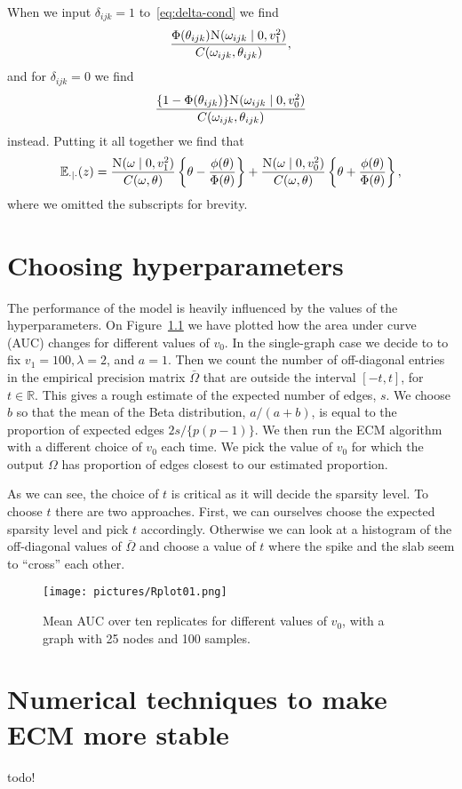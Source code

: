 \documentclass[a4paper, 11pt, oneside]{report}
\newcommand{\R}{\mathbb{R}}
\newcommand{\E}{\mathbb{E}}
\newcommand{\1}{\mathds{1}}
\newcommand{\Nor}{\textsc{N}}
\begin{document}
When we input $\delta_{ijk} = 1$ to~\eqref{eq:delta-cond} we find
\[
	\frac{\Phi(\theta_{ijk}) \Nor(\omega_{ijk} \mid 0, v_1^2)}{C(\omega_{ijk}, \theta_{ijk})},
\]
and for $\delta_{ijk} = 0$ we find
\[
	\frac{\{1 - \Phi(\theta_{ijk})\} \Nor(\omega_{ijk} \mid 0, v_0^2)}
	{C(\omega_{ijk}, \theta_{ijk})}
\]
instead.
Putting it all together we find that
\[
	\E_{\cdot \mid \cdot}(z) = \frac{\Nor(\omega \mid 0, v_1^2)}{C(\omega,
		\theta)} \left\{\theta - \frac{\phi(\theta)}{\Phi(\theta)}\right\} +
	\frac{\Nor(\omega \mid 0, v_0^2)}{C(\omega, \theta)} \left\{\theta +
	\frac{\phi(\theta)}{\Phi(\theta)}\right\},
\]
where we omitted the subscripts for brevity.

\chapter{Choosing hyperparameters}
The performance of the model is heavily influenced by the values of the
hyperparameters. On Figure~\ref{fig:mean_auc} we have plotted how the area
under curve (AUC) changes for different values of $v_0$. In the single-graph
case we decide to to fix $v_1 = 100,
	\lambda = 2$, and $a = 1$. Then we count the number of off-diagonal entries in
the empirical precision matrix $\bar \Omega$ that are outside the interval
$[-t, t]$, for $t \in \R$. This gives a rough estimate of the expected number
of edges, $s$. We choose $b$ so that the mean of the Beta distribution,
$a/(a+b)$, is equal to the proportion of expected edges $2s/\{p(p-1)\}$. We then
run the ECM algorithm with a different choice of $v_0$ each time. We pick the
value of $v_0$ for which the output $\Omega$ has proportion of edges closest to
our estimated proportion.

As we can see, the choice of $t$ is critical as it will decide the sparsity level.
To choose $t$ there are two approaches. First, we can ourselves choose the
expected sparsity level and pick $t$ accordingly. Otherwise we can look at a
histogram of the off-diagonal values of $\bar \Omega$ and choose a value of $t$
where the spike and the slab seem to ``cross'' each other.

\begin{figure}
	\centering
	\texttt{[image: pictures/Rplot01.png]}
	\caption{Mean AUC over ten replicates for different values of $v_0$, with a
		graph with 25 nodes and 100 samples.}\label{fig:mean_auc}
\end{figure}

\chapter{Numerical techniques to make ECM more stable}
todo!
\end{document}
